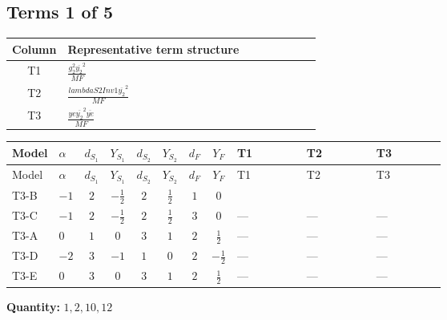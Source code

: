 \documentclass[8pt]{article}
\begin{document}
\begin{landscape}
\subsection*{Terms 1 of 5}
\begin{center}
\begin{tabular}{@{}c >{\raggedright\arraybackslash}p{0.82\linewidth}@{}}
\toprule
Column & Representative term structure \\
\midrule
T1 & \(\displaystyle \frac{g_{2}^{2} \overline{y_{2}}^{2}}{MF}\) \\
\midrule
T2 & \(\displaystyle \frac{lambdaS2Inv1 \overline{y_{2}}^{2}}{MF}\) \\
\midrule
T3 & \(\displaystyle \frac{ye \overline{y_{2}}^{2} \overline{ye}}{MF}\) \\
\midrule
\bottomrule
\end{tabular}
\end{center}
\smallskip
\tiny
\begin{longtable}{@{}llcccccc >{\raggedright\arraybackslash}p{0.21\linewidth} >{\raggedright\arraybackslash}p{0.21\linewidth} >{\raggedright\arraybackslash}p{0.21\linewidth}@{}}
\toprule
Model & $\alpha$ & $d_{S_1}$ & $Y_{S_1}$ & $d_{S_2}$ & $Y_{S_2}$ & $d_F$ & $Y_F$ & T1 & T2 & T3 \\
\midrule
\endfirsthead
\toprule
Model & $\alpha$ & $d_{S_1}$ & $Y_{S_1}$ & $d_{S_2}$ & $Y_{S_2}$ & $d_F$ & $Y_F$ & T1 & T2 & T3 \\
\midrule
\endhead
T3-B & $-1$ & $2$ & $-\frac{1}{2}$ & $2$ & $\frac{1}{2}$ & $1$ & $0$ & \scriptsize\adjustbox{max width=\linewidth}{$\begin{gathered} - \frac{3 g_{2}^{2} \overline{y_{2}}^{2}}{8 MF}\end{gathered}$} & \scriptsize\adjustbox{max width=\linewidth}{$\begin{gathered} - \frac{lambdaS2Inv1 \overline{y_{2}}^{2}}{4 MF}\end{gathered}$} & \scriptsize\adjustbox{max width=\linewidth}{$\begin{gathered} \frac{ye \overline{y_{2}}^{2} \overline{ye}}{8 MF}\end{gathered}$} \\
\midrule
T3-C & $-1$ & $2$ & $-\frac{1}{2}$ & $2$ & $\frac{1}{2}$ & $3$ & $0$ & --- & --- & --- \\
\midrule
T3-A & $0$ & $1$ & $0$ & $3$ & $1$ & $2$ & $\frac{1}{2}$ & --- & --- & --- \\
\midrule
T3-D & $-2$ & $3$ & $-1$ & $1$ & $0$ & $2$ & $-\frac{1}{2}$ & --- & --- & --- \\
\midrule
T3-E & $0$ & $3$ & $0$ & $3$ & $1$ & $2$ & $\frac{1}{2}$ & --- & --- & --- \\
\midrule
\bottomrule
\end{longtable}
\clearpage
\noindent\textbf{Quantity: }$\mathrm{1,2,10,12}$\par\smallskip

\end{landscape}
\end{document}

